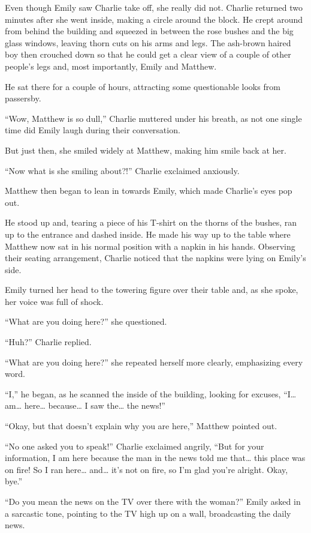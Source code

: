 Even though Emily saw Charlie take off, she really did not. Charlie returned two minutes after she went inside, making a circle around the block. He crept around from behind the building and squeezed in between the rose bushes and the big glass windows, leaving thorn cuts on his arms and legs. The ash-brown haired boy then crouched down so that he could get a clear view of a couple of other people’s legs and, most importantly, Emily and Matthew.

He sat there for a couple of hours, attracting some questionable looks from passersby.

“Wow, Matthew is so dull,” Charlie muttered under his breath, as not one single time did Emily laugh during their conversation.

But just then, she smiled widely at Matthew, making him smile back at her.

“Now what is she smiling about?!” Charlie exclaimed anxiously.

Matthew then began to lean in towards Emily, which made Charlie’s eyes pop out.

He stood up and, tearing a piece of his T-shirt on the thorns of the bushes, ran up to the entrance and dashed inside. He made his way up to the table where Matthew now sat in his normal position with a napkin in his hands. Observing their seating arrangement, Charlie noticed that the napkins were lying on Emily’s side.

Emily turned her head to the towering figure over their table and, as she spoke, her voice was full of shock.

“What are you doing here?” she questioned.

“Huh?” Charlie replied.

“What are you doing here?” she repeated herself more clearly, emphasizing every word.

“I,” he began, as he scanned the inside of the building, looking for excuses, “I… am… here… because… I saw the… the news!”

“Okay, but that doesn’t explain why you are here,” Matthew pointed out.

“No one asked you to speak!” Charlie exclaimed angrily, “But for your information, I am here because the man in the news told me that… this place was on fire! So I ran here… and… it’s not on fire, so I’m glad you’re alright. Okay, bye.”

“Do you mean the news on the TV over there with the woman?” Emily asked in a sarcastic tone, pointing to the TV high up on a wall, broadcasting the daily news.

